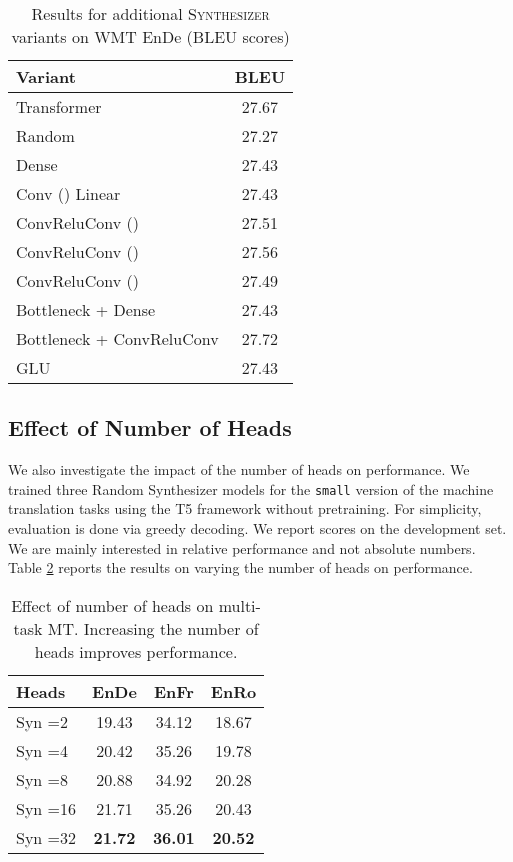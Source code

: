 \documentclass{article} \usepackage{iclr2021_conference,times}
\begin{document}
\begin{table}[H]
    \centering
    \begin{tabular}{l|c}
    \hline
      Variant  & BLEU  \\
      \hline
      Transformer & 27.67 \\ 
      Random & 27.27 \\
      Dense & 27.43 \\
      \hline
        Conv () Linear &  27.43 \\ 
         ConvReluConv () & 27.51 \\
         ConvReluConv () & 27.56 \\
         ConvReluConv () & 27.49 \\
         Bottleneck + Dense &  27.43 \\ 
         Bottleneck + ConvReluConv &  27.72 \\ 
         GLU & 27.43 \\
         \hline
    \end{tabular}
    \caption{Results for additional \textsc{Synthesizer} variants on WMT EnDe (BLEU scores)}
    \label{tab:my_label}
\end{table}

\subsection{Effect of Number of Heads}
We also investigate the impact of the number of heads on performance. We trained three Random Synthesizer models for the \texttt{small} version of the machine translation tasks using the T5 framework without pretraining. For simplicity, evaluation is done via greedy decoding. We report scores on the development set. We are mainly interested in relative performance and not absolute numbers. Table \ref{tab:headsmt} reports the results on varying the number of heads on performance. 

\begin{table}[H]
    \centering
    \small
    \begin{tabular}{l|ccc}
    \hline
        Heads &	EnDe &	EnFr &	EnRo \\
        \hline
Syn =2 &	19.43&	34.12&	18.67 \\
Syn =4	&20.42&	35.26&	19.78 \\
Syn =8	&20.88&	34.92&	20.28 \\
Syn =16 &	21.71&	35.26&	20.43 \\
Syn =32 &	\textbf{21.72}&	\textbf{36.01}&	\textbf{20.52} \\ 
\hline
    \end{tabular}
    \caption{Effect of number of heads on multi-task MT. Increasing the number of heads improves performance.}
    \label{tab:headsmt}
\end{table}
\end{document}
